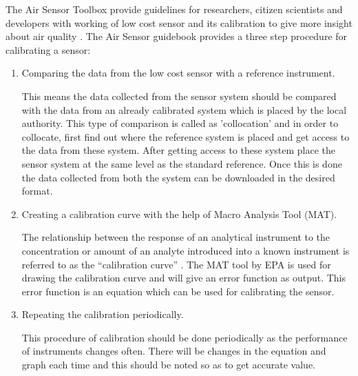 The Air Sensor Toolbox provide guidelines for researchers, citizen scientists and developers with working of low cost sensor and its calibration to give more insight about air quality \cite{airsensortoolbox}. The Air Sensor guidebook\cite{airsensorguidebook} provides a three step procedure for calibrating a sensor:
\begin{enumerate}
    \item Comparing the data from the low cost sensor with a reference instrument.
    
This means the data collected from the sensor system should be compared with the data from an already calibrated system which is placed by the local authority. This type of comparison is called as 'collocation' and in order to collocate, first find out where the reference system is placed and get access to the data from these system. After getting access to these system place the sensor system at the same level as the standard reference. Once this is done the data collected from both the system can be downloaded in the desired format.

    \item Creating a calibration curve with the help of Macro Analysis Tool (MAT).

The relationship between the response of an analytical instrument to the concentration or amount of an analyte introduced into a known instrument is referred to as the “calibration curve” \cite{Epa2010}. The MAT tool by EPA is used for drawing the calibration curve and will give an error function as output. This error function is an equation which can be used for calibrating the sensor.
    \item Repeating the calibration periodically.

    This procedure of calibration should be done periodically as the performance of instruments changes often. There will be changes in the equation and graph each time and this should be noted so as to get accurate value.
\end{enumerate} 

